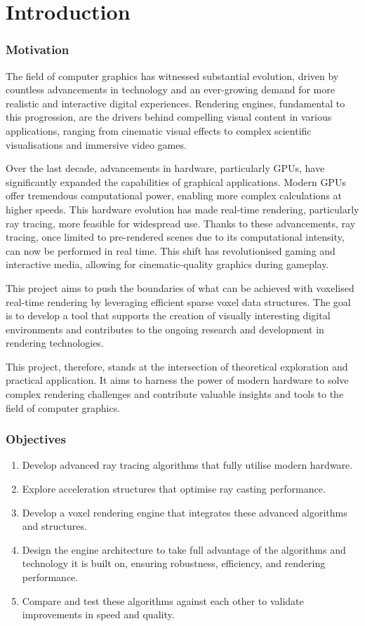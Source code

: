 
\part{Introduction}\label{intro}
\section{Motivation}
The field of computer graphics has witnessed substantial evolution, driven by countless advancements in technology and an ever-growing demand for more realistic and interactive digital experiences. Rendering engines, fundamental to this progression, are the drivers behind compelling visual content in various applications, ranging from cinematic visual effects to complex scientific visualisations and immersive video games.

Over the last decade, advancements in hardware, particularly GPUs, have significantly expanded the capabilities of graphical applications. Modern GPUs offer tremendous computational power, enabling more complex calculations at higher speeds. This hardware evolution has made real-time rendering, particularly ray tracing, more feasible for widespread use. Thanks to these advancements, ray tracing, once limited to pre-rendered scenes due to its computational intensity, can now be performed in real time. This shift has revolutionised gaming and interactive media, allowing for cinematic-quality graphics during gameplay.

This project aims to push the boundaries of what can be achieved with voxelised real-time rendering by leveraging efficient sparse voxel data structures. The goal is to develop a tool that supports the creation of visually interesting digital environments and contributes to the ongoing research and development in rendering technologies.

This project, therefore, stands at the intersection of theoretical exploration and practical application. It aims to harness the power of modern hardware to solve complex rendering challenges and contribute valuable insights and tools to the field of computer graphics.

\section{Objectives}
\label{obj}
\begin{enumerate}
  \item Develop advanced ray tracing algorithms that fully utilise modern hardware.
  \item Explore acceleration structures that optimise ray casting performance.
  \item Develop a voxel rendering engine that integrates these advanced algorithms and structures.
  \item Design the engine architecture to take full advantage of the algorithms and technology it is built on, ensuring robustness, efficiency, and rendering performance.
  \item Compare and test these algorithms against each other to validate improvements in speed and quality.
\end{enumerate}

